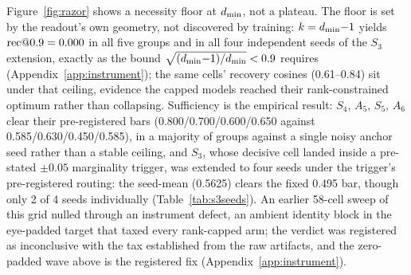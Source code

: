 Figure~\ref{fig:razor} shows a necessity floor at $d_{\min}$, not a
plateau. The floor is set by the readout's own geometry, not discovered
by training: $k = d_{\min}{-}1$ yields $\mathrm{rec}@0.9 = 0.000$ in all five
groups
and in all four independent seeds of the $S_3$ extension,
exactly as the bound $\sqrt{(d_{\min}{-}1)/d_{\min}} < 0.9$ requires
(Appendix~\ref{app:instrument}); the same cells' recovery cosines
(0.61--0.84) sit under that ceiling, evidence the capped models reached
their rank-constrained optimum rather than collapsing.
Sufficiency is
the empirical result: $S_4$, $A_5$, $S_5$, $A_6$ clear their
pre-registered bars (0.800/0.700/0.600/0.650 against
0.585/0.630/0.450/0.585),
in a majority of groups against a single noisy anchor seed rather than a
stable ceiling, and $S_3$, whose decisive cell landed inside a
pre-stated $\pm 0.05$ marginality trigger, was extended to four seeds
under the trigger's pre-registered routing: the seed-mean (0.5625)
clears the fixed 0.495 bar, though only 2 of 4 seeds individually
(Table~\ref{tab:s3seeds}).
An earlier 58-cell sweep of this grid nulled through an instrument
defect, an ambient identity block in the eye-padded target that taxed
every rank-capped arm;
the verdict was registered as inconclusive with
the tax established from the raw artifacts, and the zero-padded wave
above is the registered fix (Appendix~\ref{app:instrument}).
